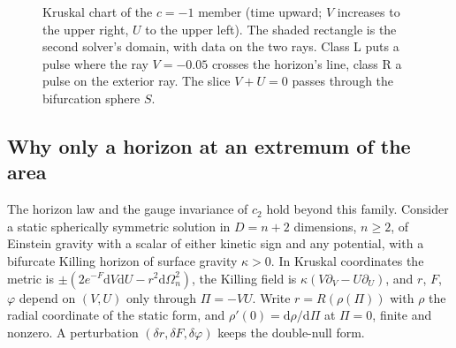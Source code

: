 \documentclass[11pt]{article}
\theoremstyle{plain}
\newcommand{\dd}{\mathrm{d}}
\newcommand{\Hp}{\mathcal H^+}
\begin{document}
\begin{figure}[H]
\centering
{}
\caption{Kruskal chart of the $c=-1$ member (time upward; $V$ increases to the upper right, $U$ to the upper left). The
shaded rectangle is the second solver's domain, with data on the two rays. Class L puts a pulse where the ray $V=-0.05$
crosses the horizon's line, class R a pulse on the exterior ray. The slice $V+U=0$ passes through the bifurcation sphere $S$.}
\label{fig:kruskal}
\end{figure}

\subsection{Why only a horizon at an extremum of the area}\label{sec:lemma}

The horizon law and the gauge invariance of $c_2$ hold beyond this family. Consider a static spherically symmetric solution
in $D=n+2$ dimensions, $n\ge2$, of Einstein gravity with a scalar of either kinetic sign and any potential, with a bifurcate
Killing horizon of surface gravity $\kappa>0$. In Kruskal coordinates the metric is $\pm(2e^{-F}\dd V\dd U-r^2\dd\Omega_n^2)$,
the Killing field is $\kappa(V\partial_V-U\partial_U)$, and $r$, $F$, $\varphi$ depend on $(V,U)$ only through $\Pi=-VU$. Write
$r=R(\rho(\Pi))$ with $\rho$ the radial coordinate of the static form, and $\rho'(0)=\dd\rho/\dd\Pi$ at $\Pi=0$, finite and
nonzero. A perturbation $(\delta r,\delta F,\delta\varphi)$ keeps the double-null form.
\end{document}
